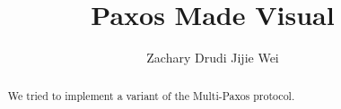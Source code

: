 \documentclass{sig-alternate}
\begin{document}
%

\title{Paxos Made Visual}
%
%
%
%
%

%
\author{
%
%
\alignauthor
Zachary Drudi  
\alignauthor
Jijie Wei		
}


\maketitle

\begin{abstract}
We tried to implement a variant of the Multi-Paxos protocol. 
\end{abstract}
\end{document}
